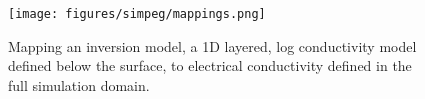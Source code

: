 \begin{figure}[!htbp]
\begin{center}
\texttt{[image: figures/simpeg/mappings.png]}
\end{center}
\caption{
Mapping an inversion model, a 1D layered, log conductivity model defined below the surface, to electrical conductivity defined in the full simulation domain.
}
\label{fig:simpeg-mappings}
\end{figure}
